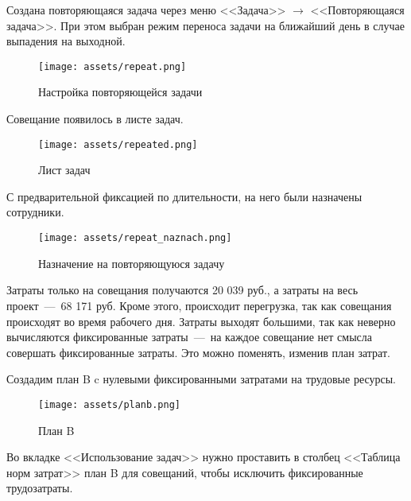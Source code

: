 Создана повторяющаяся задача через меню <<Задача>> $\rightarrow$ <<Повторяющаяся задача>>. При этом выбран режим переноса задачи на ближайший день в случае выпадения на выходной.

\begin{figure}[H]
    \begin{center}
    \texttt{[image: assets/repeat.png]}
    \caption{Настройка повторяющейся задачи}
    \label{fig:2}
    \end{center}
\end{figure}

Совещание появилось в листе задач.

\begin{figure}[H]
    \begin{center}
    \texttt{[image: assets/repeated.png]}
    \caption{Лист задач}
    \label{fig:2}
    \end{center}
\end{figure}

\newpage

С предварительной фиксацией по длительности, на него были назначены сотрудники.

\begin{figure}[H]
    \begin{center}
    \texttt{[image: assets/repeat\_naznach.png]}
    \caption{Назначение на повторяющуюся задачу}
    \label{fig:2}
    \end{center}
\end{figure}

Затраты только на совещания получаются 20 039 руб., а затраты на весь проект~---~68 171 руб. Кроме этого, происходит перегрузка, так как совещания происходят во время рабочего дня. Затраты выходят большими, так как неверно вычисляются фиксированные затраты~---~на каждое совещание нет смысла совершать фиксированные затраты. Это можно поменять, изменив план затрат.

Создадим план B c нулевыми фиксированными затратами на трудовые ресурсы.

\begin{figure}[H]
    \begin{center}
    \texttt{[image: assets/planb.png]}
    \caption{План B}
    \label{fig:2}
    \end{center}
\end{figure}

Во вкладке <<Использование задач>> нужно проставить в столбец <<Таблица норм затрат>> план B для совещаний, чтобы исключить фиксированные трудозатраты.

